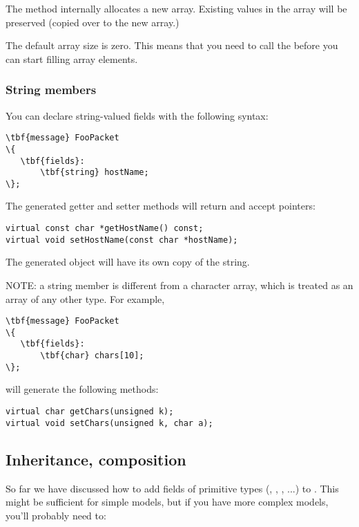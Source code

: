 The  method internally allocates a new array. Existing
values in the array will be preserved (copied over to the new array.)

The default array size is zero. This means that you need to call the
 before you can start filling array elements.


\subsubsection{String members}

You can declare string-valued fields with the following syntax:

\begin{Verbatim}[commandchars=\\\{\}]
\tbf{message} FooPacket
\{
   \tbf{fields}:
       \tbf{string} hostName;
\};
\end{Verbatim}

The generated getter and setter methods will return and accept 
pointers:

\begin{verbatim}
virtual const char *getHostName() const;
virtual void setHostName(const char *hostName);
\end{verbatim}

The generated object will have its own copy of the string.

NOTE: a string member is different from a character array,
which is treated as an array of any other type. For example,

\begin{Verbatim}[commandchars=\\\{\}]
\tbf{message} FooPacket
\{
   \tbf{fields}:
       \tbf{char} chars[10];
\};
\end{Verbatim}

will generate the following methods:

\begin{verbatim}
virtual char getChars(unsigned k);
virtual void setChars(unsigned k, char a);
\end{verbatim}


\subsection{Inheritance, composition}

So far we have discussed how to add fields of primitive types
(, , , ...) to .
This might be sufficient for simple models, but if you have
more complex models, you'll probably need to:

